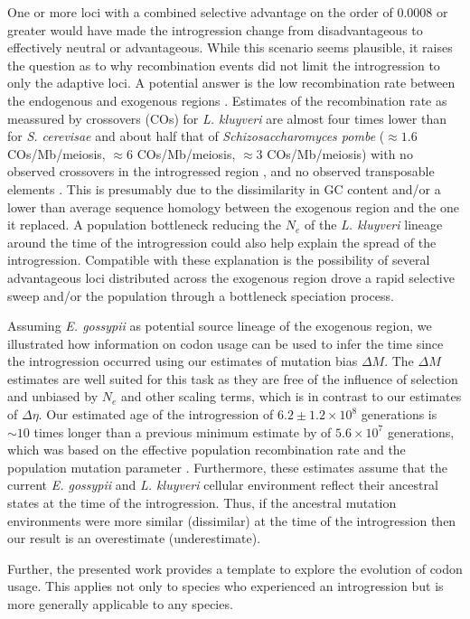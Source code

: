 \documentclass[doublespacing,linenumbers]{bmcart-modified}
\newcommand{\kluyveri}{\textit{L. kluyveri}\xspace}
\newcommand{\gossypii}{\textit{E. gossypii}\xspace}
\newcommand{\GC}{GC content\xspace}
\newcommand{\DM}{\ensuremath{{\Delta M}}\xspace}
\newcommand{\DE}{\ensuremath{{\Delta \eta}}\xspace}
\newcommand{\Ne}{\ensuremath{N_e}\xspace}
\begin{document}
One or more loci with a combined selective advantage on the order of $0.0008$ or greater would have made the introgression change from disadvantageous to effectively neutral or advantageous.
While this scenario seems plausible, it raises the question as to why recombination events did not limit the introgression to only the adaptive loci.
A potential answer is the low recombination rate between the endogenous and exogenous regions \cite{payen2009, brion2017}.
Estimates of the recombination rate as meassured by crossovers (COs) for \kluyveri are almost four times lower than for \textit{S. cerevisae} and about half that of \textit{Schizosaccharomyces pombe} ($\approx1.6$ COs/Mb/meiosis, $\approx6$ COs/Mb/meiosis, $\approx3$ COs/Mb/meiosis) with no observed crossovers in the introgressed region \cite{brion2017}, and no observed transposable elements \cite{payen2009}.
This is presumably due to the dissimilarity in \GC and/or a lower than average sequence homology between the exogenous region and the one it replaced.
A population bottleneck reducing the \Ne of the \kluyveri lineage around the time of the introgression could also help explain the spread of the introgression.
Compatible with these explanation is the possibility of several advantageous loci distributed across the exogenous region drove a rapid selective sweep and/or the population through a bottleneck speciation process.

Assuming \gossypii as potential source lineage of the exogenous region, we illustrated how information on codon usage can be used to infer the time since the introgression occurred using our estimates of mutation bias \DM.
The \DM estimates are well suited for this task as they are free of the influence of selection and unbiased by $\Ne$ and other scaling terms, which is in contrast to our estimates of \DE \citep{gilchrist2015}.
Our estimated age of the introgression of $6.2\pm1.2\times 10^8$ generations is $\sim 10$ times longer than a previous minimum estimate by \cite{friedrich2015} of $5.6\times 10^7$ generations, which was based on the effective population recombination rate and the population mutation parameter \citep{Ruderfer2006}.
Furthermore, these estimates assume that the current \gossypii and \kluyveri cellular environment reflect their ancestral states at the time of the introgression.
Thus, if the ancestral mutation environments were more similar (dissimilar) at the time of the introgression then our result is an overestimate (underestimate).

Further, the presented work provides a template to explore the evolution of codon usage.
This applies not only to species who experienced an introgression but is more generally applicable to any species.
\end{document}
